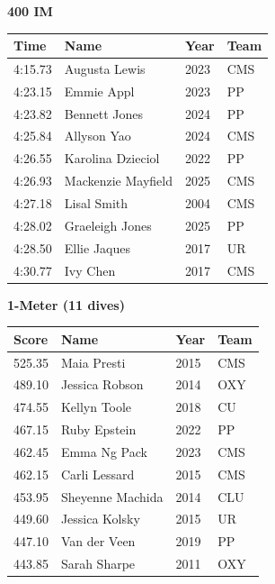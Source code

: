 \vspace{1.2em}
\noindent\begin{minipage}[t]{0.98\textwidth}
\centering
\textbf{\textcolor{teamprimary}{400 IM}}\par
\vspace{0.5em}
\centering
\small
\renewcommand{\arraystretch}{1.0}
\setlength{\tabcolsep}{4pt}
\begin{tabular}{@{}p{2.5cm}p{4.5cm}p{1.5cm}p{2.5cm}@{}}
\toprule
\textbf{Time} & \textbf{Name} & \textbf{Year} & \textbf{Team} \\
\midrule
4:15.73 & Augusta Lewis & 2023 & CMS \\
4:23.15 & Emmie Appl & 2023 & PP \\
4:23.82 & Bennett Jones & 2024 & PP \\
4:25.84 & Allyson Yao & 2024 & CMS \\
4:26.55 & Karolina Dzieciol & 2022 & PP \\
4:26.93 & Mackenzie Mayfield & 2025 & CMS \\
4:27.18 & Lisal Smith & 2004 & CMS \\
4:28.02 & Graeleigh Jones & 2025 & PP \\
4:28.50 & Ellie Jaques & 2017 & UR \\
4:30.77 & Ivy Chen & 2017 & CMS \\
\bottomrule
\end{tabular}
\end{minipage}
\vspace{1.2em}
\noindent\begin{minipage}[t]{0.98\textwidth}
\centering
\textbf{\textcolor{teamprimary}{1-Meter (11 dives)}}\par
\vspace{0.5em}
\centering
\small
\renewcommand{\arraystretch}{1.0}
\setlength{\tabcolsep}{4pt}
\begin{tabular}{@{}p{2.5cm}p{4.5cm}p{1.5cm}p{2.5cm}@{}}
\toprule
\textbf{Score} & \textbf{Name} & \textbf{Year} & \textbf{Team} \\
\midrule
525.35 & Maia Presti & 2015 & CMS \\
489.10 & Jessica Robson & 2014 & OXY \\
474.55 & Kellyn Toole & 2018 & CU \\
467.15 & Ruby Epstein & 2022 & PP \\
462.45 & Emma Ng Pack & 2023 & CMS \\
462.15 & Carli Lessard & 2015 & CMS \\
453.95 & Sheyenne Machida & 2014 & CLU \\
449.60 & Jessica Kolsky & 2015 & UR \\
447.10 & Van der Veen & 2019 & PP \\
443.85 & Sarah Sharpe & 2011 & OXY \\
\bottomrule
\end{tabular}
\end{minipage}
